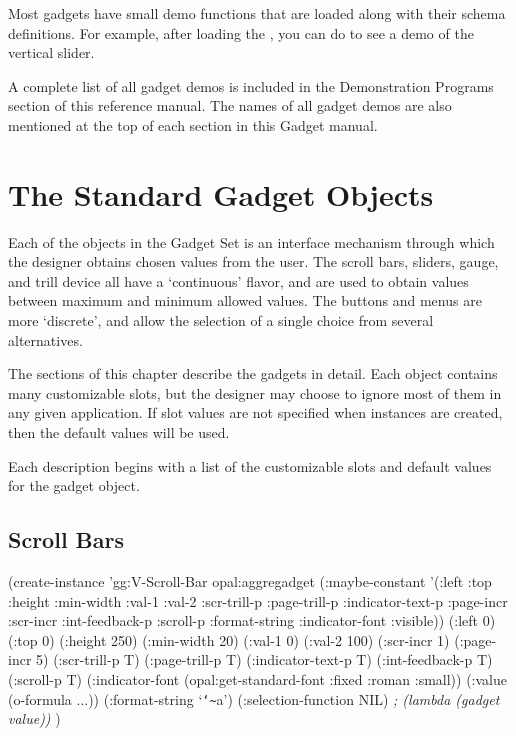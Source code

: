 Most gadgets have small demo functions that are loaded along with their
schema definitions.  For example, after loading the
, you can do  to see a demo of the
vertical slider.

A complete list of all gadget demos is included in the Demonstration Programs
section of this reference manual.  The names of all gadget demos are also
mentioned at the top of each section in this Gadget manual.



\chapter{The Standard Gadget Objects}
\label{Standard-Gadgets}

Each of the objects in the Gadget Set is an interface mechanism
through which the designer obtains chosen values from the user.  The
scroll bars, sliders, gauge, and trill device all have a `continuous'
flavor, and are used to obtain values between maximum and minimum
allowed values.  The buttons and menus are more `discrete', and allow
the selection of a single choice from several alternatives.

The sections of this chapter describe the gadgets in detail.  Each
object contains many customizable slots, but the designer may choose
to ignore most of them in any given application.  If slot values are
not specified when instances are created, then the default values will
be used.

Each description begins with a list of the customizable slots and
default values for the gadget object.

\begin{group}
\section{Scroll Bars}
\label{scroll-bars}

\begin{programexample}
(create-instance 'gg:V-Scroll-Bar opal:aggregadget
   (:maybe-constant '(:left :top :height :min-width :val-1 :val-2 :scr-trill-p
                      :page-trill-p :indicator-text-p :page-incr :scr-incr
                      :int-feedback-p :scroll-p :format-string :indicator-font
                      :visible))
   (:left 0)
   (:top 0)
   (:height 250)
   (:min-width 20)
   (:val-1 0)
   (:val-2 100)
   (:scr-incr 1)
   (:page-incr 5)
   (:scr-trill-p T)
   (:page-trill-p T)
   (:indicator-text-p T)
   (:int-feedback-p T)
   (:scroll-p T)
   (:indicator-font (opal:get-standard-font :fixed :roman :small))
   (:value (o-formula ...))
   (:format-string `{\tt\char`\~}a')
   (:selection-function NIL)   {\it ; (lambda (gadget value))}
   )
\end{programexample}
\end{group}
\vspace{1 line}

